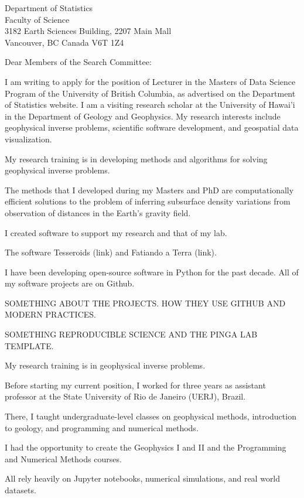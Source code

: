 \documentclass[11pt]{letter}
\begin{document}
\begin{letter}{
    Department of Statistics
    \\
    Faculty of Science
    \\
    3182 Earth Sciences Building, 2207 Main Mall
    \\
    Vancouver, BC Canada V6T 1Z4
}
\opening{Dear Members of the Search Committee:}

I am writing to apply for the position of Lecturer in the Masters of Data
Science Program of the University of British Columbia, as advertised on the
Department of Statistics website.
I am a visiting research scholar at the University of Hawai'i in the Department
of Geology and Geophysics.
My research interests include geophysical inverse problems, scientific
software development, and geospatial data visualization.

My research training is in developing methods and algorithms for solving
geophysical inverse problems.

The methods that I developed during my Masters and PhD are computationally
efficient solutions to the problem of inferring subsurface density variations
from observation of distances in the Earth's gravity field.

I created software to support my research and that of my lab.

The software Tesseroids (link) and Fatiando a Terra (link).


I have been developing open-source software in Python for the past decade.
All of my software projects are on Github.

SOMETHING ABOUT THE PROJECTS.
HOW THEY USE GITHUB AND MODERN PRACTICES.


SOMETHING REPRODUCIBLE SCIENCE AND THE PINGA LAB TEMPLATE.

My research training is in geophysical inverse problems.


Before starting my current position, I worked for three years as assistant
professor at the State University of Rio de Janeiro (UERJ), Brazil.

There, I taught undergraduate-level classes on geophysical methods,
introduction to geology, and programming and numerical methods.

I had the opportunity to create the Geophysics I and II and the Programming
and Numerical Methods courses.

All rely heavily on Jupyter notebooks, numerical simulations, and real world
datasets.


\end{letter}
\end{document}
